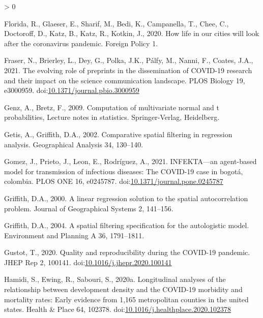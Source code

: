 \documentclass[]{elsarticle} %
\newlength{\cslhangindent}
\newenvironment{CSLReferences}[2] %
 {%
  \setlength{\parindent}{0pt}
  \ifodd #1 \everypar{\setlength{\hangindent}{\cslhangindent}}\ignorespaces\fi
  \ifnum #2 > 0
  \setlength{\parskip}{#2\baselineskip}
  \fi
 }%
 {}
\begin{document}
\begin{CSLReferences}{1}{0}
\leavevmode\hypertarget{ref-Florida2020how}{}%
Florida, R., Glaeser, E., Sharif, M., Bedi, K., Campanella, T., Chee,
C., Doctoroff, D., Katz, B., Katz, R., Kotkin, J., 2020. How life in our
cities will look after the coronavirus pandemic. Foreign Policy 1.

\leavevmode\hypertarget{ref-Fraser2021evolving}{}%
Fraser, N., Brierley, L., Dey, G., Polka, J.K., Pálfy, M., Nanni, F.,
Coates, J.A., 2021. The evolving role of preprints in the dissemination
of COVID-19 research and their impact on the science communication
landscape. PLOS Biology 19, e3000959.
doi:\href{https://doi.org/10.1371/journal.pbio.3000959}{10.1371/journal.pbio.3000959}

\leavevmode\hypertarget{ref-mvtnorm2009}{}%
Genz, A., Bretz, F., 2009. Computation of multivariate normal and t
probabilities, Lecture notes in statistics. Springer-Verlag, Heidelberg.

\leavevmode\hypertarget{ref-Getis2002comparative}{}%
Getis, A., Griffith, D.A., 2002. Comparative spatial filtering in
regression analysis. Geographical Analysis 34, 130--140.

\leavevmode\hypertarget{ref-Gomez2021infekta}{}%
Gomez, J., Prieto, J., Leon, E., Rodríguez, A., 2021. INFEKTA---an
agent-based model for transmission of infectious diseases: The COVID-19
case in bogotá, colombia. PLOS ONE 16, e0245787.
doi:\href{https://doi.org/10.1371/journal.pone.0245787}{10.1371/journal.pone.0245787}

\leavevmode\hypertarget{ref-Griffith2000linear}{}%
Griffith, D.A., 2000. A linear regression solution to the spatial
autocorrelation problem. Journal of Geographical Systems 2, 141--156.

\leavevmode\hypertarget{ref-Griffith2004spatial}{}%
Griffith, D.A., 2004. A spatial filtering specification for the
autologistic model. Environment and Planning A 36, 1791--1811.

\leavevmode\hypertarget{ref-Gustot2020quality}{}%
Gustot, T., 2020. Quality and reproducibility during the COVID-19
pandemic. JHEP Rep 2, 100141.
doi:\href{https://doi.org/10.1016/j.jhepr.2020.100141}{10.1016/j.jhepr.2020.100141}

\leavevmode\hypertarget{ref-Hamidi2020longitudinal}{}%
Hamidi, S., Ewing, R., Sabouri, S., 2020a. Longitudinal analyses of the
relationship between development density and the COVID-19 morbidity and
mortality rates: Early evidence from 1,165 metropolitan counties in the
united states. Health \& Place 64, 102378.
doi:\href{https://doi.org/10.1016/j.healthplace.2020.102378}{10.1016/j.healthplace.2020.102378}


\end{CSLReferences}
\end{document}
